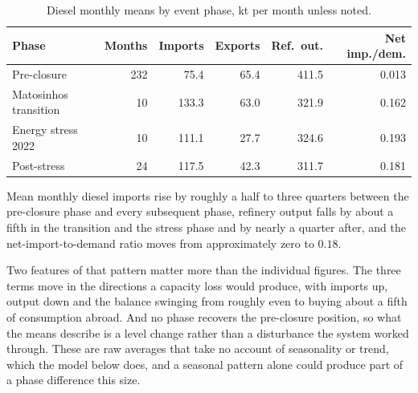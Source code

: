 \documentclass[11pt,a4paper]{article}
\begin{document}
\begin{table}[htbp]
\centering
\caption{Diesel monthly means by event phase, kt per month unless noted.}
\label{tab:phases}
\begin{tabular}{lrrrrr}
\toprule
Phase & Months & Imports & Exports & Ref.\ out. & Net imp./dem. \\
\midrule
Pre-closure & 232 & 75.4 & 65.4 & 411.5 & 0.013 \\
Matosinhos transition & 10 & 133.3 & 63.0 & 321.9 & 0.162 \\
Energy stress 2022 & 10 & 111.1 & 27.7 & 324.6 & 0.193 \\
Post-stress & 24 & 117.5 & 42.3 & 311.7 & 0.181 \\
\bottomrule
\end{tabular}
\end{table}

Mean monthly diesel imports rise by roughly a half to three quarters between the pre-closure
phase and every subsequent phase, refinery output falls by about a fifth in the transition and
the stress phase and by nearly a quarter after, and the net-import-to-demand ratio moves from
approximately zero to $0.18$.

Two features of that pattern matter more than the individual figures. The three terms move in
the directions a capacity loss would produce, with imports up, output down and the balance
swinging from roughly even to buying about a fifth of consumption abroad. And no phase
recovers the pre-closure position, so what the means describe is a level change rather than a
disturbance the system worked through. These are raw averages that take no account of
seasonality or trend, which the model below does, and a seasonal pattern alone could produce
part of a phase difference this size.
\end{document}
